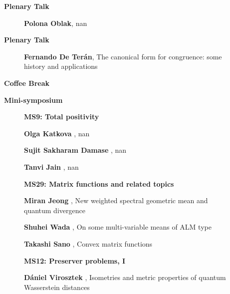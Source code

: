 \documentclass[ILAS2025-program.tex]{subfiles}
\begin{document}
    \begin{description}
    \item[] \textbf{Plenary Talk} 
    \begin{description}
        \item[] \textbf{Polona Oblak}, nan
        \end{description}
        \item[] \textbf{Plenary Talk} 
    \begin{description}
        \item[] \textbf{Fernando De Terán}, The canonical form for congruence: some history and applications
        \end{description}
        \item[] \textbf{Coffee Break} 
    \item[] \textbf{Mini-symposium} 
    \begin{description}
    \item[] {\color{mstitle}\textbf{MS9: Total positivity}} 
    \item[] \textbf{Olga Katkova} , nan
        \item[] \textbf{Sujit Sakharam Damase} , nan
        \item[] \textbf{Tanvi Jain} , nan
        \end{description}
    \begin{description}
    \item[] {\color{mstitle}\textbf{MS29: Matrix functions and related topics}} 
    \item[] \textbf{Miran Jeong} , New weighted spectral geometric mean and quantum divergence
        \item[] \textbf{Shuhei Wada} , On some multi-variable means of ALM type
        \item[] \textbf{Takashi Sano} , Convex matrix functions
        \end{description}
    \begin{description}
    \item[] {\color{mstitle}\textbf{MS12: Preserver problems, I}} 
    \item[] \textbf{Dániel Virosztek} , Isometries and metric properties of quantum Wasserstein distances

\end{description}
\end{description}
\end{document}

